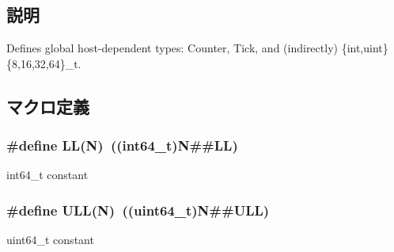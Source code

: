 \subsection{説明}
Defines global host-\/dependent types: Counter, Tick, and (indirectly) \{int,uint\}\{8,16,32,64\}\_\-t. 

\subsection{マクロ定義}
\hypertarget{base_2types_8hh_a959db1cfc6f9f5c23aefcda92bfc763e}{
\subsubsection[{LL}]{\setlength{\rightskip}{0pt plus 5cm}\#define LL(N)~((int64\_\-t)N\#\#LL)}}
\label{base_2types_8hh_a959db1cfc6f9f5c23aefcda92bfc763e}
int64\_\-t constant \hypertarget{base_2types_8hh_adcc3cf526a71c0dfaae020d432c78b83}{
\subsubsection[{ULL}]{\setlength{\rightskip}{0pt plus 5cm}\#define ULL(N)~((uint64\_\-t)N\#\#ULL)}}
\label{base_2types_8hh_adcc3cf526a71c0dfaae020d432c78b83}
uint64\_\-t constant 

